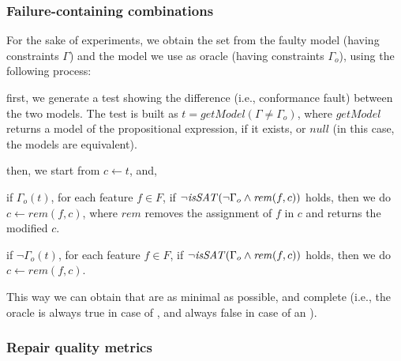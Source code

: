 \begin{tikzborder}{\cite{Gargantini16:validation}}
\begin{tikzborder}{\cite{gargantini_combinatorial_2017}}
\begin{tikzborder}{\cite{gargantini_combinatorial_2017}}
\begin{tikzborder}{\cite{garn2019}}
\begin{tikzborder}{\cite{arcaini2019achieving}}
\begin{tikzborder}{\cite{arcaini2019varivolution}}
		\subsubsection{Failure-containing combinations}
		
		\bb For the sake of experiments, we obtain the set \fccSet from the faulty model \m (having constraints $\Gamma$) and the model we use as oracle \mO (having constraints $\Gamma_o$), using the following process:
		\begin{compactenum}
			\item first, we generate a test showing the difference (i.e., conformance fault) between the two models. The test is built as $t = \mathit{getModel}(\Gamma \neq \Gamma_o)$, where $\mathit{getModel}$ returns a model of the propositional expression, if it exists, or $\mathit{null}$ (in this case, the models are equivalent).
			\item then, we start from $c \leftarrow t$, and,
			\begin{compactitem}
				\item if $\Gamma_o(t)$, for each feature $f \in F$, if $\neg \mathit{isSAT}(\neg \Gamma_o \wedge \mathit{rem}(f, c))$ holds, then we do $c \leftarrow \mathit{rem}(f, c)$, where $\mathit{rem}$ removes the assignment of $f$ in $c$ and returns the modified $c$.
				\item if $\neg \Gamma_o(t)$, for each feature $f \in F$, if $\neg \mathit{isSAT}(\Gamma_o \wedge \mathit{rem}(f, c))$ holds, then we do $c \leftarrow \mathit{rem}(f, c)$.
			\end{compactitem}
		\end{compactenum}
		This way we can obtain \fccs that are as minimal as possible, and complete (i.e., the oracle is always true in case of \overConstr \fcc, and always false in case of an \underConstr \fcc).\be
		
		\subsubsection{Repair quality metrics}\label{sec:qualityMetrics}
		

\end{tikzborder}
\end{tikzborder}
\end{tikzborder}
\end{tikzborder}
\end{tikzborder}
\end{tikzborder}
